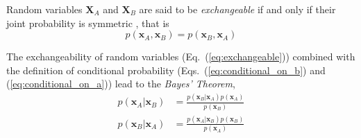 Random variables $\mathbf{X}_A$ and $\mathbf{X}_B$ are said to be \emph{exchangeable}
if and only if their joint probability is symmetric \cite{Greenland2005}, that is
\begin{equation}
  p(\mathbf{x}_A, \mathbf{x}_B) = p(\mathbf{x}_B, \mathbf{x}_A)
\label{eq:exchangeable}
\end{equation}

The exchangeability of random variables (Eq.~(\ref{eq:exchangeable})) combined with the definition of conditional probability (Eqs.~(\ref{eq:conditional_on_b}) and (\ref{eq:conditional_on_a})) lead to the \emph{Bayes' Theorem},
\begin{equation}
  \begin{split}
    p(\mathbf{x}_A | \mathbf{x}_B) & = \frac{p(\mathbf{x}_B | \mathbf{x}_A) p(\mathbf{x}_A)}{p(\mathbf{x}_B)} \\
    p(\mathbf{x}_B | \mathbf{x}_A) & = \frac{p(\mathbf{x}_A | \mathbf{x}_B) p(\mathbf{x}_B)}{p(\mathbf{x}_A)}
  \end{split}
\label{eq:bayes_theorem}
\end{equation}
